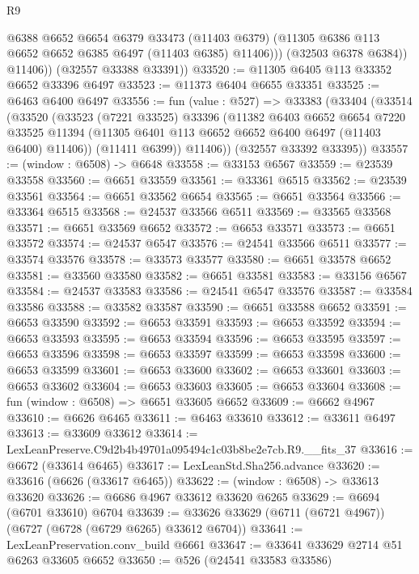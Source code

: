 \begin{lexlean}{R9}
\begin{coremodule}
                @6388
                @6652
                @6654
                @6379
                @33473
                (@11403 @6379)
                (@11305 @6386 @113 @6652 @6652 @6385 @6497 (@11403 @6385) @11406)))
            (@32503 @6378 @6384))
          @11406))
      (@32557 @33388 @33391))
@33520 := @11305 @6405 @113 @33352 @6652 @33396 @6497
@33523 := @11373 @6404 @6655 @33351
@33525 := @6463 @6400 @6497
@33556 := fun (value : @527) =>
  @33383
    (@33404
      (@33514
        (@33520
          (@33523
            (@7221 @33525)
            @33396
            (@11382
              @6403
              @6652
              @6654
              @7220
              @33525
              @11394
              (@11305 @6401 @113 @6652 @6652 @6400 @6497 (@11403 @6400) @11406))
            (@11411 @6399))
          @11406))
      (@32557 @33392 @33395))
@33557 := (window : @6508) -> @6648
@33558 := @33153 @6567
@33559 := @23539 @33558
@33560 := @6651 @33559
@33561 := @33361 @6515
@33562 := @23539 @33561
@33564 := @6651 @33562 @6654
@33565 := @6651 @33564
@33566 := @33364 @6515
@33568 := @24537 @33566 @6511
@33569 := @33565 @33568
@33571 := @6651 @33569 @6652
@33572 := @6653 @33571
@33573 := @6651 @33572
@33574 := @24537 @6547
@33576 := @24541 @33566 @6511
@33577 := @33574 @33576
@33578 := @33573 @33577
@33580 := @6651 @33578 @6652
@33581 := @33560 @33580
@33582 := @6651 @33581
@33583 := @33156 @6567
@33584 := @24537 @33583
@33586 := @24541 @6547 @33576
@33587 := @33584 @33586
@33588 := @33582 @33587
@33590 := @6651 @33588 @6652
@33591 := @6653 @33590
@33592 := @6653 @33591
@33593 := @6653 @33592
@33594 := @6653 @33593
@33595 := @6653 @33594
@33596 := @6653 @33595
@33597 := @6653 @33596
@33598 := @6653 @33597
@33599 := @6653 @33598
@33600 := @6653 @33599
@33601 := @6653 @33600
@33602 := @6653 @33601
@33603 := @6653 @33602
@33604 := @6653 @33603
@33605 := @6653 @33604
@33608 := fun (window : @6508) => @6651 @33605 @6652
@33609 := @6662 @4967
@33610 := @6626 @6465
@33611 := @6463 @33610
@33612 := @33611 @6497
@33613 := @33609 @33612
@33614 := LexLeanPreserve.C9d2b4b49701a095494c1c03b8be2e7cb.R9.__fits_37
@33616 := @6672 (@33614 @6465)
@33617 := LexLeanStd.Sha256.advance
@33620 := @33616 (@6626 (@33617 @6465))
@33622 := (window : @6508) -> @33613 @33620
@33626 := @6686 @4967 @33612 @33620 @6265
@33629 := @6694 (@6701 @33610) @6704
@33639 := @33626 @33629 (@6711 (@6721 @4967)) (@6727 (@6728 (@6729 @6265) @33612 @6704))
@33641 := LexLeanPreservation.conv_build @6661
@33647 := @33641 @33629 @2714 @51 @6263 @33605 @6652
@33650 := @526 (@24541 @33583 @33586)

\end{coremodule}
\end{lexlean}
